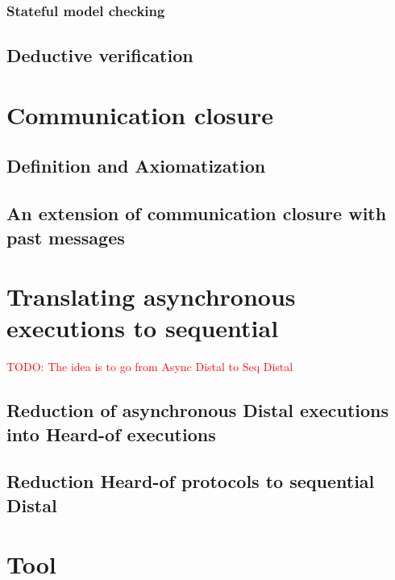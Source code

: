 \documentclass[11pt]{report}
\theoremstyle{plain}
\theoremstyle{definition}
\newcommand{\todo}[1]{\textcolor{red}{TODO: #1}}
\begin{document}
        \subsection{Stateful model checking}

    \section{Deductive verification}
    \label{preliminaries:verification}
    

\chapter{Communication closure}
\label{commclosure}
    \section{Definition and Axiomatization}
    \label{commclosure:definition}
    

    \section{An extension of communication closure with past messages}
    \label{commclosure:extension}
    

\chapter{Translating asynchronous executions to sequential}
\label{async2seq}
    \todo{The idea is to go from Async Distal to Seq Distal}
    \section{Reduction of asynchronous Distal executions into Heard-of executions}
    \label{async2seq:procedure}

    \section{Reduction Heard-of protocols to sequential Distal}
    \label{async2seq:sequentialization}

\chapter{Tool}
\label{tool}
\end{document}
